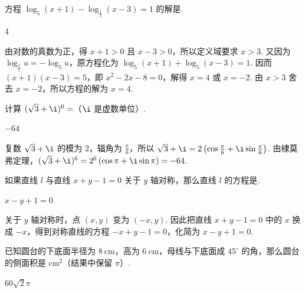 \begin{problem}
方程 \(\log_5(x+1)-\log_{\frac{1}{5}}(x-3)=1\) 的解是\fillinblank{}.
\end{problem}

\begin{answer}
4
\end{answer}

\begin{solution}
由对数的真数为正，得 \(x+1>0\) 且 \(x-3>0\)，所以定义域要求 \(x>3\). 又因为 \(\log_{\frac{1}{5}}u=-\log_5u\)，原方程化为 \(\log_5(x+1)+\log_5(x-3)=1\). 因而 \((x+1)(x-3)=5\)，即 \(x^2-2x-8=0\)，解得 \(x=4\) 或 \(x=-2\). 由 \(x>3\) 舍去 \(x=-2\)，所以方程的解为 \(x=4\).
\end{solution}

\begin{problem}
计算 \((\sqrt{3} + \i)^6=\)\fillinblank{}（\(\i\) 是虚数单位）.
\end{problem}

\begin{answer}
\(-64\)
\end{answer}

\begin{solution}
复数 \(\sqrt{3}+\i\) 的模为 \(2\)，辐角为 \(\frac{\pi}{6}\)，所以 \(\sqrt{3}+\i=2\left(\cos\frac{\pi}{6}+\i\sin\frac{\pi}{6}\right)\). 由棣莫弗定理，\((\sqrt{3}+\i)^6=2^6\left(\cos\pi+\i\sin\pi\right)=-64\).
\end{solution}

\begin{problem}
如果直线 \(l\) 与直线 \(x + y - 1 = 0\) 关于 \(y\) 轴对称，那么直线 \(l\) 的方程是\fillinblank{}.
\end{problem}

\begin{answer}
\(x - y + 1 = 0\)
\end{answer}

\begin{solution}
关于 \(y\) 轴对称时，点 \((x,y)\) 变为 \((-x,y)\). 因此把直线 \(x+y-1=0\) 中的 \(x\) 换成 \(-x\)，得到对称直线的方程 \(-x+y-1=0\)，化简为 \(x-y+1=0\).
\end{solution}

\begin{problem}
已知圆台的下底面半径为 \(8 \mathrm{~cm}\)，高为 \(6 \mathrm{~cm}\)，母线与下底面成 \(45^\circ\) 的角，那么圆台的侧面积是\fillinblank{} \(\mathrm{cm}^2\)（结果中保留 \(\pi\)）.
\end{problem}

\begin{answer}
\(60\sqrt{2}\pi\)
\end{answer}

